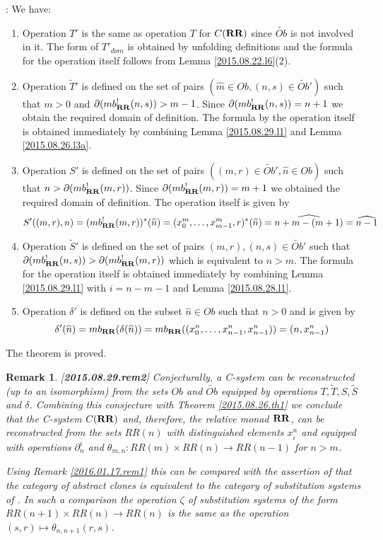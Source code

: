 \documentclass[11pt]{article}
\newenvironment{proof}{{\bf Proof}:}{\vskip 5mm }
\newtheorem{remark}[proposition]{Remark}
\newcommand{\llabel}[1]{\label{#1}[{\bf #1}]}
\newcommand{\sr}{\rightarrow}
\newcommand{\wt}{\widetilde}
\newcommand{\wh}{\widehat}
\newcommand{\RR}{{\bf RR}}
\begin{document}
\begin{proof}
We have:
%
\begin{enumerate}
%
\item Operation $T'$ is the same as operation $T$ for $C(\RR)$ since $\wt{Ob}$ is not involved in it. The form of $T'_{dom}$ is obtained by unfolding definitions and the formula for the operation itself follows from Lemma \ref{2015.08.22.l6}(2).
%
\item Operation $\wt{T}'$ is defined on the set of pairs $(\wh{m}\in Ob, (n,s)\in \wt{Ob}')$ such that $m>0$ and $\partial(mb_{\RR}^!(n,s))>m-1$. Since $\partial(mb_{\RR}^!(n,s))=n+1$ we obtain the required domain of definition. The formula by the operation itself is obtained immediately by combining Lemma \ref{2015.08.29.l1} and Lemma \ref{2015.08.26.l3a}.
%
\item Operation $S'$ is defined on the set of pairs $((m,r)\in \wt{Ob}',\wh{n}\in Ob)$ such that $n>\partial(mb_{\RR}^!(m,r))$. Since $\partial(mb_{\RR}^!(m,r))=m+1$ we obtained the required domain of definition. The operation itself is given by
%
$$S'((m,r),n)=(mb_{\RR}^!(m,r))^*(\wh{n})=(x_0^m,\dots,x_{m-1}^m,r)^*(\wh{n})=\wh{n+m-(m+1)}=\wh{n-1}$$
%
\item Operation $\wt{S}'$ is defined on the set of pairs $(m,r),(n,s)\in \wt{Ob}'$ 
such that $\partial(mb_{\RR}^!(n,s))>\partial(mb_{\RR}^!(m,r))$ which is equivalent to $n>m$. The formula for the operation itself is obtained immediately by combining Lemma \ref{2015.08.29.l1} with $i=n-m-1$ and  Lemma \ref{2015.08.28.l1}. 
%
\item Operation $\delta'$ is defined on the subset $\wh{n}\in Ob$ such that $n>0$ and is given by
%
$$\delta'(\wh{n})=mb_{\RR}(\delta(\wh{n}))=mb_{\RR}((x_0^n,\dots,x_{n-1}^n,x_{n-1}^n))=(n,x_{n-1}^n)$$
%
\end{enumerate}
%
The theorem is proved. 
\end{proof}
%
\begin{remark}\rm
\llabel{2015.08.29.rem2}
Conjecturally, a C-system can be reconstructed (up to an isomorphism) from the sets $Ob$ and $\wt{Ob}$ equipped by operations $T,\wt{T},S,\wt{S}$ and $\delta$. Combining this consjecture with Theorem \ref{2015.08.26.th1} we conclude that the C-system $C(\RR)$ and, therefore, the relative monad $\RR$, can be reconstructed from the sets $RR(n)$ with distinguished elements $x^n_i$ and equipped with operations $\partial_n^i$ and $\theta_{m,n}:RR(m)\times RR(n)\sr RR(n-1)$ for $n>m$. 

Using Remark \ref{2016.01.17.rem1} this can be compared with the assertion of \cite[Theorem 3.3]{FPT} that the category of abstract clones is equivalent to the category of substitution systems of \cite[Definition 3.1]{FPT}. In such a comparison the operation $\zeta$ of substitution systems of the form $RR(n+1)\times RR(n)\sr RR(n)$ is the same as the operation $(s,r)\mapsto \theta_{n,n+1}(r,s)$. 
\end{remark}
\end{document}
